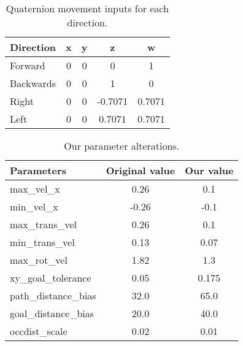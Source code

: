 \documentclass{article}
\begin{document}
\begin{table}[h]
\vskip 3mm
\begin{center}
\begin{small}
\begin{sc}
\begin{tabular}{lcccc}
\hline
\abovespace\belowspace
Direction & x & y & z & w \\
\hline
  Forward & 0 & 0 & 0 & 1\\
  Backwards & 0 & 0 & 1 & 0 \\
  Right & 0 & 0 & -0.7071 & 0.7071 \\
  Left & 0 & 0 & 0.7071 & 0.7071 
\end{tabular}
\end{sc}
\end{small}
\caption{Quaternion movement inputs for each direction.}
\label{tab:quaternions}
\end{center}
\vskip -3mm
\end{table}
\begin{table}[h]
\vskip 3mm
\begin{center}
\begin{small}
\begin{sc}
\begin{tabular}{lcc}
\hline
\abovespace\belowspace
Parameters & Original value & Our value \\
\hline
  max\_vel\_x & 0.26 & 0.1 \\
  min\_vel\_x & -0.26 & -0.1 \\
  max\_trans\_vel & 0.26 & 0.1 \\
  min\_trans\_vel & 0.13 & 0.07 \\
  max\_rot\_vel & 1.82 & 1.3 \\
  xy\_goal\_tolerance & 0.05 & 0.175 \\
  path\_distance\_bias & 32.0 & 65.0 \\
  goal\_distance\_bias & 20.0 & 40.0 \\
  occdist\_scale & 0.02 & 0.01
\end{tabular}
\end{sc}
\end{small}
\caption{Our parameter alterations.}
\label{tab:params}
\end{center}
\vskip -3mm
\end{table}
\end{document}
